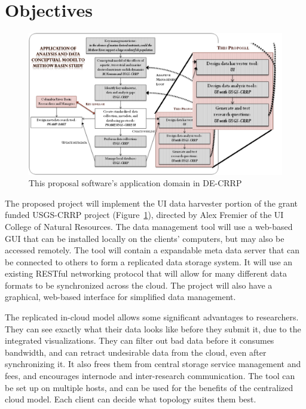  \doublespacing

\section{Objectives}

\begin{figure}[!h]
        \begin{center}
		\includegraphics[width=120mm]{images/combo_proposal}
                \caption{This proposal software's application domain in DE-CRRP}
                \label{combo_proposal}
        \end{center}
\end{figure}

The proposed project will implement the UI data harvester portion of the grant
funded USGS-CRRP project (Figure~\ref{combo_proposal}), directed by Alex
Fremier of the UI College of Natural Resources. The data management tool will
use a web-based GUI that can be installed locally on the clients' computers,
but may also be accessed remotely.  The tool will contain a expandable meta
data server that can be connected to others to form a replicated data storage
system. It will use an existing RESTful networking protocol that will allow for many
different data formats to be synchronized across the cloud. The project will
also have a graphical, web-based interface for simplified data management.

The replicated in-cloud model allows some significant advantages to
researchers.  They can see exactly what their data looks like before they
submit it, due to the integrated visualizations.  They can filter out bad data
before it consumes bandwidth, and can retract undesirable data from the cloud,
even after synchronizing it. It also frees them from central storage service
management and fees, and encourages internode and inter-research communication.
The tool can be set up on multiple hosts, and can be used for the benefits of
the centralized cloud model. Each client can decide what topology suites them
best.

